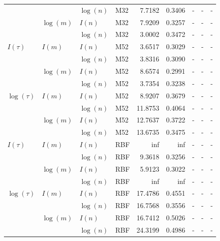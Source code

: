 \begin{table}
\begin{tabularx}{1\textwidth}{|llllrr >{\raggedright\arraybackslash}X>{\raggedright\arraybackslash}X>{\raggedright\arraybackslash}X|}
   &  & $\log({n})$ & M32 & 7.7182 & 0.3406 &  - &  - & - \\
   & $\log({m})$ & $I({n})$ & M32 & 7.9209 & 0.3257 &  - &  - & - \\
   &  & $\log({n})$ & M32 & 3.0002 & 0.3472 &  - &  - & - \\
 $I({\tau})$ & $I({m})$ & $I({n})$ & M52 & 3.6517 & 0.3029 &  - &  - & - \\
   &  & $\log({n})$ & M52 & 3.8316 & 0.3090 &  - &  - & - \\
   & $\log({m})$ & $I({n})$ & M52 & 8.6574 & 0.2991 &  - &  - & - \\
   &  & $\log({n})$ & M52 & 3.7354 & 0.3238 &  - &  - & - \\
 $\log({\tau})$ & $I({m})$ & $I({n})$ & M52 & 8.9207 & 0.3679 &  - &  - & - \\
   &  & $\log({n})$ & M52 & 11.8753 & 0.4064 &  - &  - & - \\
   & $\log({m})$ & $I({n})$ & M52 & 12.7637 & 0.3722 &  - &  - & - \\
   &  & $\log({n})$ & M52 & 13.6735 & 0.3475 &  - &  - & - \\
 $I({\tau})$ & $I({m})$ & $I({n})$ & RBF & inf & inf &  - &  - & - \\
   &  & $\log({n})$ & RBF & 9.3618 & 0.3256 &  - &  - & - \\
   & $\log({m})$ & $I({n})$ & RBF & 5.9123 & 0.3022 &  - &  - & - \\
   &  & $\log({n})$ & RBF & inf & inf &  - &  - & - \\
 $\log({\tau})$ & $I({m})$ & $I({n})$ & RBF & 17.4786 & 0.4551 &  - &  - & - \\
   &  & $\log({n})$ & RBF & 16.7568 & 0.3556 &  - &  - & - \\
   & $\log({m})$ & $I({n})$ & RBF & 16.7412 & 0.5026 &  - &  - & - \\
   &  & $\log({n})$ & RBF & 24.3199 & 0.4986 &  - &  - & - \\
 \hline
 \end{tabularx}
\end{table}

